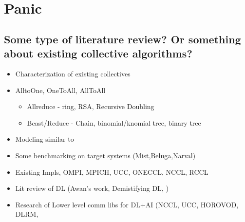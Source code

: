 
\glsresetall %
\chapter[Panic]{Panic}\label{ch:Panic}

\section{Some type of literature review? Or something about existing collective algorithms?}

\begin{itemize}
	\item{Characterization of existing collectives}
	\item{AlltoOne, OneToAll, AllToAll}
    \begin{itemize}
        \item{Allreduce - ring, RSA, Recursive Doubling}
        \item{Bcast/Reduce - Chain, binomial/knomial tree, binary tree}
    \end{itemize}
    \item{Modeling similar to \cite{Thakur2005OptMPICH}}
    \item{Some benchmarking on target systems (Mist,Beluga,Narval)}
    \item{Existing Impls, OMPI, MPICH, UCC, ONECCL, NCCL, RCCL}
\end{itemize}

\begin{itemize}
    \item Lit review of DL (Awan's work, Demistifying DL, )
    \item Research of Lower level comm libs for DL+AI (NCCL, UCC, HOROVOD, DLRM, 
\end{itemize}

\clearpage